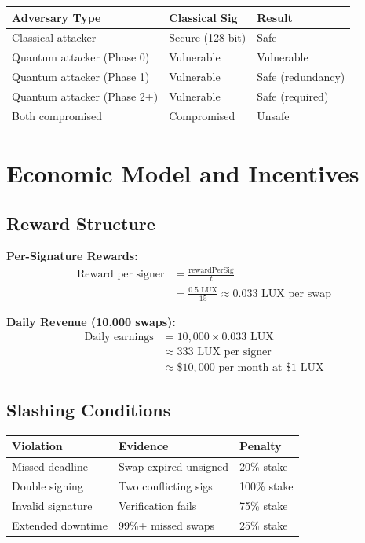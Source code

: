 \documentclass[11pt]{article}
\begin{document}
\begin{table}[h]
\centering
\begin{tabular}{@{}lll@{}}
\toprule
\textbf{Adversary Type} & \textbf{Classical Sig} & \textbf{Result} \\
\midrule
Classical attacker & Secure (128-bit) & Safe \\
Quantum attacker (Phase 0) & Vulnerable & Vulnerable \\
Quantum attacker (Phase 1) & Vulnerable & Safe (redundancy) \\
Quantum attacker (Phase 2+) & Vulnerable & Safe (required) \\
Both compromised & Compromised & Unsafe \\
\bottomrule
\end{tabular}

\label{tab:dual-sig-security}
\end{table}

\section{Economic Model and Incentives}

\subsection{Reward Structure}

\textbf{Per-Signature Rewards:}
\begin{align}
\text{Reward per signer} &= \frac{\text{rewardPerSig}}{t} \\
&= \frac{0.5 \text{ LUX}}{15} \approx 0.033 \text{ LUX per swap}
\end{align}

\textbf{Daily Revenue (10,000 swaps):}
\begin{align}
\text{Daily earnings} &= 10{,}000 \times 0.033 \text{ LUX} \\
&\approx 333 \text{ LUX per signer} \\
&\approx \$10{,}000 \text{ per month at } \$1 \text{ LUX}
\end{align}

\subsection{Slashing Conditions}

\begin{table}[h]
\centering
\begin{tabular}{@{}lll@{}}
\toprule
\textbf{Violation} & \textbf{Evidence} & \textbf{Penalty} \\
\midrule
Missed deadline & Swap expired unsigned & 20\% stake \\
Double signing & Two conflicting sigs & 100\% stake \\
Invalid signature & Verification fails & 75\% stake \\
Extended downtime & 99\%+ missed swaps & 25\% stake \\
\bottomrule
\end{tabular}

\label{tab:slashing}
\end{table}
\end{document}
